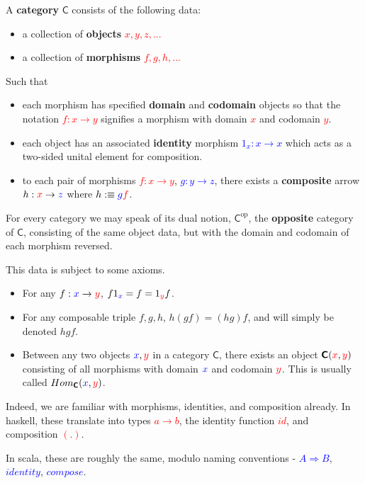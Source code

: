 \documentclass[tikz]{beamer}
\newcommand{\cat}[1]{\bm{ \mathsf{#1} }}
\newcommand{\cc}{\cat{C}}
\newcommand{\op}[1]{#1^{\text{op}}}
\newcommand{\opc}{\op{\cc}}
\newcommand{\red}[1]{\textcolor{red}{#1}}
\newcommand{\mred}[1]{\textcolor{red}{$#1$}}
\newcommand{\blue}[1]{\textcolor{blue}{#1}}
\newcommand{\mblue}[1]{\textcolor{blue}{$#1$}}
\theoremstyle{definition}
\begin{document}
\frame
{
	\begin{definition}[Category]
		A \textbf{category} $\cc$ consists of the following data: 
		
		\begin{itemize}
			\item a collection of \textbf{objects} \mred{x, y, z,...}
			\item a collection of \textbf{morphisms} \mred{f,g,h,...}
		\end{itemize}
		
		Such that 
		
		\begin{itemize}
			\item each morphism has specified \textbf{domain} and \textbf{codomain} objects so that the notation \mred{f : x \to y} signifies a morphism with domain \mred{x} and codomain \mred{y}. 
			\item each object has an associated \textbf{identity} morphism \mblue{1_x : x \to x} which acts as a two-sided unital element for composition.
			\item to each pair of morphisms \mred{f : x \to y}, \mblue{g : y \to z}, there exists a \textbf{composite} arrow $h : \red{x} \to \blue{z}$ where $h :\equiv \blue{g}\red{f}$. 
		\end{itemize}
	\end{definition}
}

\frame
{
	For every category we may speak of its dual notion, $\opc$, the \textbf{opposite} category of $\cc$, consisting of the same object data, but with the domain and codomain of each morphism reversed.
}

\frame
{
	This data is subject to some axioms. 
	
	\begin{itemize}
	
		\item For any $f : \blue{x} \to \red{y}$, $f1_{\blue{x}} = f =  1_{\red{y}} f$. 
		\item For any composable triple $f,g,h$, $h(gf) = (hg)f$, and will simply be denoted $hgf$.
		\item Between any two objects $\blue{x}, \red{y}$ in a category $\cc$, there exists an object $\cc(\red{x},\red{y})$ consisting of all morphisms with domain $\blue{x}$ and codomain $\red{y}$. This is usually called $Hom_{\cc}(\blue{x}, \red{y})$.
	\end{itemize}
}

\frame
{

	Indeed, we are familiar with morphisms, identities, and composition already. In haskell, these translate into types \mred{a \to b}, the identity function \mred{id}, and composition \mred{(.)}. 
	
	In scala, these are roughly the same, modulo naming conventions - \mblue{A \Rightarrow B}, \mblue{identity}, \mblue{compose}.  
}
\end{document}

